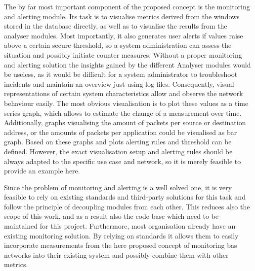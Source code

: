 The by far most important component of the proposed concept is the monitoring and alerting module.
Its task is to visualise metrics derived from the windows stored in the database directly, as well as to visualise the results from the analyser modules.
Most importantly, it also generates user alerts if values raise above a certain secure threshold, so a system administration can assess the situation and possibly initiate counter measures.
Without a proper monitoring and alerting solution the insights gained by the different Analyser modules would be useless, as it would be difficult for a system administrator to troubleshoot incidents and maintain an overview just using log files.
Consequently, visual representations of certain system characteristics allow and observe the network behaviour easily.
The most obvious visualisation is to plot these values as a time series graph, which allows to estimate the change of a measurement over time.
Additionally, graphs visualising the amount of packets per source or destination address, or the amounts of packets per application could be visualised as bar graph.
Based on these graphs and plots alerting rules and threshold can be defined.
However, the exact visualisation setup and alerting rules should be always adapted to the specific use case and network, so it is merely feasible to provide an example here.

Since the problem of monitoring and alerting is a well solved one, it is very feasible to rely on existing standards and third-party solutions for this task and follow the principle of decoupling modules from each other.
This reduces also the scope of this work, and as a result also the code base which need to be maintained for this project.
Furthermore, most organisation already have an existing monitoring solution. By relying on standards it allows them to easily incorporate measurements from the here proposed concept of monitoring \gls{bas} networks into their existing system and possibly combine them with other metrics.


